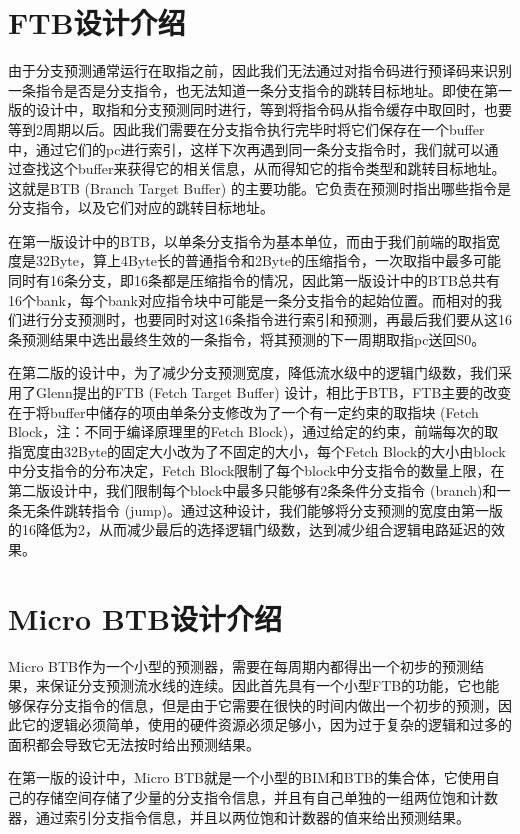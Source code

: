 \section{FTB设计介绍}

由于分支预测通常运行在取指之前，因此我们无法通过对指令码进行预译码来识别一条指令是否是分支指令，也无法知道一条分支指令的跳转目标地址。即使在第一版的设计中，取指和分支预测同时进行，等到将指令码从指令缓存中取回时，也要等到2周期以后。因此我们需要在分支指令执行完毕时将它们保存在一个buffer中，通过它们的pc进行索引，这样下次再遇到同一条分支指令时，我们就可以通过查找这个buffer来获得它的相关信息，从而得知它的指令类型和跳转目标地址。这就是BTB (Branch Target Buffer) 的主要功能。它负责在预测时指出哪些指令是分支指令，以及它们对应的跳转目标地址。

在第一版设计中的BTB，以单条分支指令为基本单位，而由于我们前端的取指宽度是32Byte，算上4Byte长的普通指令和2Byte的压缩指令，一次取指中最多可能同时有16条分支，即16条都是压缩指令的情况，因此第一版设计中的BTB总共有16个bank，每个bank对应指令块中可能是一条分支指令的起始位置。而相对的我们进行分支预测时，也要同时对这16条指令进行索引和预测，再最后我们要从这16条预测结果中选出最终生效的一条指令，将其预测的下一周期取指pc送回S0。

在第二版的设计中，为了减少分支预测宽度，降低流水级中的逻辑门级数，我们采用了Glenn提出的FTB (Fetch Target Buffer) 设计，相比于BTB，FTB主要的改变在于将buffer中储存的项由单条分支修改为了一个有一定约束的取指块 (Fetch Block，注：不同于编译原理里的Fetch Block)，通过给定的约束，前端每次的取指宽度由32Byte的固定大小改为了不固定的大小，每个Fetch Block的大小由block中分支指令的分布决定，Fetch Block限制了每个block中分支指令的数量上限，在第二版设计中，我们限制每个block中最多只能够有2条条件分支指令 (branch)和一条无条件跳转指令 (jump)。通过这种设计，我们能够将分支预测的宽度由第一版的16降低为2，从而减少最后的选择逻辑门级数，达到减少组合逻辑电路延迟的效果。

\section{Micro BTB设计介绍}

Micro BTB作为一个小型的预测器，需要在每周期内都得出一个初步的预测结果，来保证分支预测流水线的连续。因此首先具有一个小型FTB的功能，它也能够保存分支指令的信息，但是由于它需要在很快的时间内做出一个初步的预测，因此它的逻辑必须简单，使用的硬件资源必须足够小，因为过于复杂的逻辑和过多的面积都会导致它无法按时给出预测结果。

在第一版的设计中，Micro BTB就是一个小型的BIM和BTB的集合体，它使用自己的存储空间存储了少量的分支指令信息，并且有自己单独的一组两位饱和计数器，通过索引分支指令信息，并且以两位饱和计数器的值来给出预测结果。


